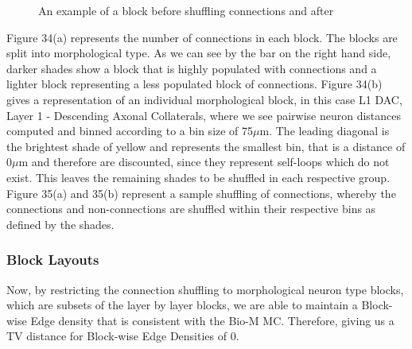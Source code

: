 \begin{figure}[H]%
    \centering
    \captionsetup{justification=centering}
    \qquad
    \caption{An example of a block before shuffling connections and after}%
    \label{fig:example}%
\end{figure}
Figure 34(a) represents the number of connections in each block. The blocks are split into morphological type. As we can see by the bar on the right hand side, darker shades show a block that is highly populated with connections and a lighter block representing a less populated block of connections. 
Figure 34(b) gives a representation of an individual morphological block, in this case L1 DAC, Layer 1 - Descending Axonal Collaterals, where we see pairwise neuron distances computed and binned according to a bin size of 75$\mu$m. The leading diagonal is the brightest shade of yellow and represents the smallest bin, that is a distance of 0$\mu$m and therefore are discounted, since they represent self-loops which do not exist. This leaves the remaining shades to be shuffled in each respective group. 
Figure 35(a) and 35(b) represent a sample shuffling of connections, whereby the connections and non-connections are shuffled within their respective bins as defined by the shades.
\subsubsection{Block Layouts}
Now, by restricting the connection shuffling to morphological neuron type blocks, which are subsets of the layer by layer blocks, we are able to maintain a Block-wise Edge density that is consistent with the Bio-M MC. Therefore, giving us a TV distance for Block-wise Edge Densities of 0. 

